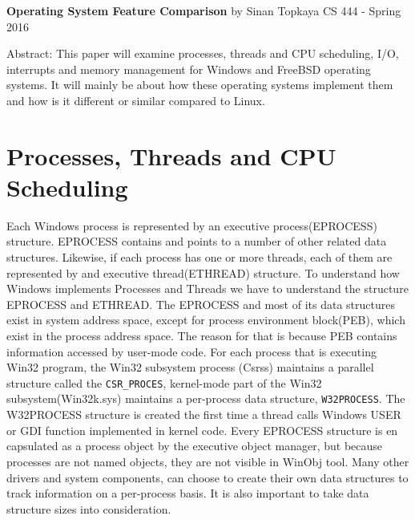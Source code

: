 \documentclass[letterpaper,10pt,draftclsnofoot,onecolumn]{IEEEtran}
\begin{document}
	\begin{titlepage}
		
		\begin{center}
		\bigbreak	
		\textbf{Operating System Feature Comparison}
		\bigbreak
		by Sinan Topkaya
		\smallbreak
		CS 444 - Spring 2016
		\end{center}
		\vfill
		
		Abstract: This paper will examine processes, threads and CPU scheduling, I/O, interrupts and memory management for Windows and FreeBSD operating systems. It will mainly be about how these operating systems implement them and how is it different or similar compared to Linux. 
		
	\end{titlepage}

\section*{Processes, Threads and CPU Scheduling}

Each Windows process is represented by an executive process(EPROCESS) structure. EPROCESS contains and points to a number of other related data structures. Likewise, if each process has one or more threads, each of them are represented by and executive thread(ETHREAD) structure. To understand how Windows implements Processes and Threads we have to understand the structure EPROCESS and ETHREAD. 
The EPROCESS and most of its data structures exist in system address space, except for process environment block(PEB), which exist in the process address space. The reason for that is because PEB contains information accessed by user-mode code. For each process that is executing Win32 program, the Win32 subsystem process (Csrss) maintains a parallel structure called the \verb|CSR_PROCES|, kernel-mode part of the Win32 subsystem(Win32k.sys) maintains a per-process data structure, \verb|W32PROCESS|. The W32PROCESS structure is created the first time a thread calls Windows USER or GDI function implemented in kernel code. Every EPROCESS structure is en capsulated as a process object by the executive object manager, but because processes are not named objects, they are not visible in WinObj tool. Many other drivers and system components, can choose to create their own data structures to track information on a per-process basis. It is also important to take data structure sizes into consideration.\cite{[1]}
\end{document}

